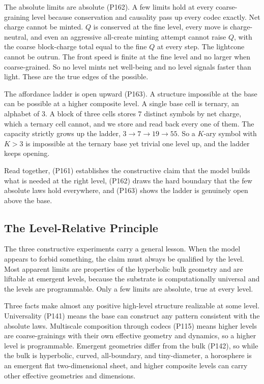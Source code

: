 The absolute limits are absolute (P162). A few limits hold at every coarse-graining level because conservation and causality pass up every codec exactly. Net charge cannot be minted. $Q$ is conserved at the fine level, every move is charge-neutral, and even an aggressive all-create minting attempt cannot raise $Q$, with the coarse block-charge total equal to the fine $Q$ at every step. The lightcone cannot be outrun. The front speed is finite at the fine level and no larger when coarse-grained. So no level mints net well-being and no level signals faster than light. These are the true edges of the possible.

The affordance ladder is open upward (P163). A structure impossible at the base can be possible at a higher composite level. A single base cell is ternary, an alphabet of $3$. A block of three cells stores $7$ distinct symbols by net charge, which a ternary cell cannot, and we store and read back every one of them. The capacity strictly grows up the ladder, $3 \to 7 \to 19 \to 55$. So a $K$-ary symbol with $K > 3$ is impossible at the ternary base yet trivial one level up, and the ladder keeps opening.

Read together, (P161) establishes the constructive claim that the model builds what is needed at the right level, (P162) draws the hard boundary that the few absolute laws hold everywhere, and (P163) shows the ladder is genuinely open above the base.

\subsection{The Level-Relative Principle}

The three constructive experiments carry a general lesson. When the model appears to forbid something, the claim must always be qualified by the level. Most apparent limits are properties of the hyperbolic bulk geometry and are liftable at emergent levels, because the substrate is computationally universal and the levels are programmable. Only a few limits are absolute, true at every level.

Three facts make almost any positive high-level structure realizable at some level. Universality (P141) means the base can construct any pattern consistent with the absolute laws. Multiscale composition through codecs (P115) means higher levels are coarse-grainings with their own effective geometry and dynamics, so a higher level is programmable. Emergent geometries differ from the bulk (P142), so while the bulk is hyperbolic, curved, all-boundary, and tiny-diameter, a horosphere is an emergent flat two-dimensional sheet, and higher composite levels can carry other effective geometries and dimensions.

